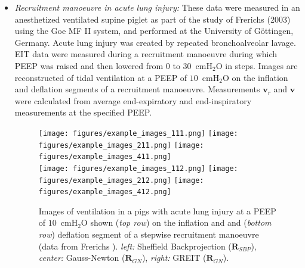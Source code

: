 \documentclass[12pt]{iopart}
\newcommand{\vB}{\mbox{$\mathbf{v}$}}
\newcommand{\RB}{\mbox{$\mathbf{R}$}}
\begin{document}
\begin{itemize}
%
%
\item
{\em Recruitment manoeuvre in acute lung injury:}
These data were measured in an anesthetized
ventilated supine piglet as part of the study of
Frerichs \etal  (2003) using the 
Goe MF II system, and performed at the
University of G\"ottingen, Germany. Acute lung injury
was created by repeated
bronchoalveolar lavage. EIT data were
measured during a recruitment manoeuvre
during which PEEP was raised and then
lowered from 0 to 30~cmH$_2$O in steps. 
Images are reconstructed of tidal ventilation
at a PEEP of $10$~cmH$_2$O on the inflation
and deflation segments of a recruitment manoeuvre.
Measurements $\vB_r$ and $\vB$
were calculated from average end-expiratory
and end-inspiratory measurements at the specified
PEEP.

\begin{figure}[bhtp]
\begin{center}
\texttt{[image: figures/example\_images\_111.png]}
\texttt{[image: figures/example\_images\_211.png]}
\texttt{[image: figures/example\_images\_411.png]}
\\
\texttt{[image: figures/example\_images\_112.png]}
\texttt{[image: figures/example\_images\_212.png]}
\texttt{[image: figures/example\_images\_412.png]}
\caption{
\label{fig:Frerichs03images}
Images of ventilation in a pigs with
acute lung injury 
at a PEEP of $10$~cmH$_2$O shown ({\em top row})
on the inflation and 
and ({\em bottom row})
deflation segment of a stepwise recruitment manoeuvre 
(data from Frerichs ).
{\em left:} Sheffield Backprojection ($\RB_{SBP}$),
{\em center:} Gauss-Newton ($\RB_{GN}$),
{\em right:} GREIT ($\RB_{GN}$).
}
\end{center}
\end{figure}


\end{itemize}
\end{document}
